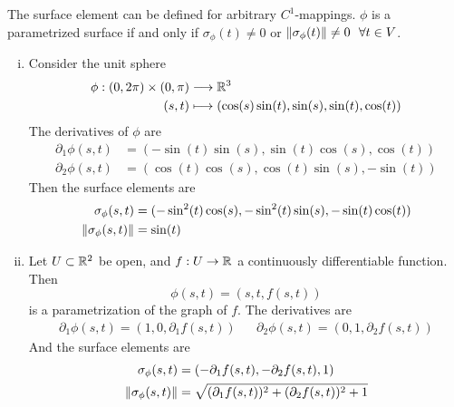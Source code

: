 \documentclass[../../script.tex]{subfiles}
\begin{document}
\begin{rem}
    The surface element can be defined for arbitrary $C^1$-mappings. $\phi$ is a parametrized surface if and only if 
    $\sigma_{\phi}(t) \ne 0$ or $\norm{\sigma_{\phi}(t)} \ne 0 ~~\forall t \in V$.
\end{rem}

\begin{eg}
    \begin{enumerate}[(i)]
        \item Consider the unit sphere 
        \begin{align*}
            \phi: (0, 2\pi) \times (0, \pi) &\longrightarrow \mathbb{R}^3 \\
            (s, t) &\longmapsto (\cos(s)\sin(t), \sin(s),\sin(t), \cos(t))
        \end{align*}
        The derivatives of $\phi$ are 
        \begin{align*}
            \partial_1 \phi(s, t) &= (-\sin(t)\sin(s), \sin(t)\cos(s), \cos(t)) \\
            \partial_2 \phi(s, t) &= (\cos(t)\cos(s), \cos(t)\sin(s), -\sin(t))
        \end{align*}
        Then the surface elements are 
        \begin{align*}
            \sigma_{\phi}(s, t) &= (-\sin^2(t)\cos(s), -\sin^2(t)\sin(s), -\sin(t)\cos(t)) \\
            \norm{\sigma_{\phi}(s, t)} &= \sin(t)
        \end{align*}

        \item Let $U \subset \mathbb{R}^2$ be open, and $f: U \rightarrow \mathbb{R}$ a continuously differentiable function. Then 
        \[
            \phi(s, t) = (s, t, f(s, t))
        \]
        is a parametrization of the graph of $f$. The derivatives are 
        \begin{align*}
            \partial_1 \phi(s, t) = (1, 0, \partial_1 f(s, t)) && \partial_2 \phi(s, t) = (0, 1, \partial_2 f(s, t))
        \end{align*}
        And the surface elements are 
        \begin{align*}
            \sigma_{\phi}(s, t) &= (-\partial_1 f(s, t), -\partial_2 f(s, t), 1) \\
            \norm{\sigma_{\phi}(s, t)} &= \sqrt{(\partial_1 f(s, t))^2 + (\partial_2 f(s, t))^2 + 1}
        \end{align*}
    \end{enumerate}
\end{eg}
\end{document}
